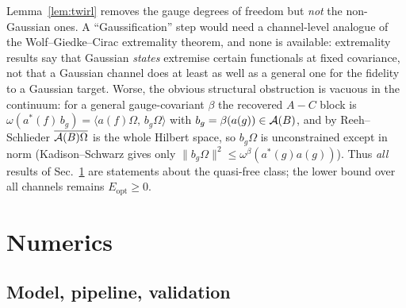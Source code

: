 \documentclass[11pt]{article}
\newcommand{\Erec}{E_{\mathrm{opt}}}
\begin{document}
\begin{verdictgap}
Lemma~\ref{lem:twirl} removes the gauge degrees of freedom but \emph{not} the
non-Gaussian ones.  A ``Gaussification'' step would need a channel-level
analogue of the Wolf--Giedke--Cirac extremality theorem, and none is available:
extremality results say that Gaussian \emph{states} extremise certain
functionals at fixed covariance, not that a Gaussian channel does at least as
well as a general one for the fidelity to a Gaussian target.  Worse, the
obvious structural obstruction is vacuous in the continuum: for a general
gauge-covariant \(\beta\) the recovered \(A\!-\!C\) block is
\(\omega(a^*(f)\,b_g)=\langle a(f)\Omega,\,b_g\Omega\rangle\) with
\(b_g=\beta(a(g))\in\mathcal A(B)\), and by Reeh--Schlieder \(\overline{\mathcal A(B)\Omega}\)
is the whole Hilbert space, so \(b_g\Omega\) is unconstrained except in norm
(Kadison--Schwarz gives only \(\|b_g\Omega\|^2\le\omega^\beta(a^*(g)a(g))\)).
Thus \emph{all} results of Sec.~\ref{sec:numerics} are statements about the
quasi-free class; the lower bound over all channels remains
\(\Erec\ge0\).
\end{verdictgap}



\section{Numerics}\label{sec:numerics}

\subsection{Model, pipeline, validation}
\end{document}
